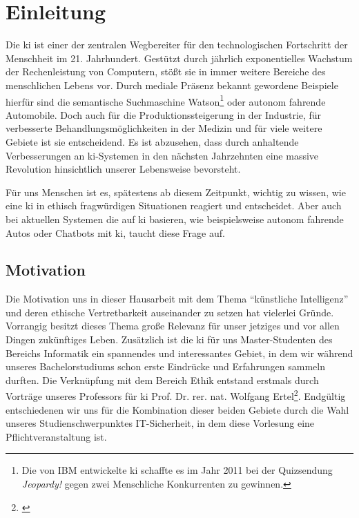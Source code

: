 \section{Einleitung}
Die \ac{ki} ist einer der zentralen Wegbereiter für den technologischen Fortschritt der Menschheit im 21. Jahrhundert.
Gestützt durch jährlich exponentielles Wachstum der Rechenleistung von Computern, stößt sie in immer weitere Bereiche des menschlichen Lebens vor.
Durch mediale Präsenz bekannt gewordene Beispiele hierfür sind die semantische Suchmaschine Watson\footnote{Die von IBM entwickelte \ac{ki} schaffte es im Jahr 2011 bei der Quizsendung \textit{Jeopardy!} gegen zwei Menschliche Konkurrenten zu gewinnen.} oder autonom fahrende Automobile. %
Doch auch für die Produktionssteigerung in der Industrie, für verbesserte Behandlungsmöglichkeiten in der Medizin und für viele weitere Gebiete ist sie entscheidend.
Es ist abzusehen, dass durch anhaltende Verbesserungen an \ac{ki}-Systemen in den nächsten Jahrzehnten eine massive Revolution hinsichtlich unserer Lebensweise bevorsteht.

Für uns Menschen ist es, spätestens ab diesem Zeitpunkt, wichtig zu wissen, wie eine \ac{ki} in ethisch fragwürdigen Situationen reagiert und entscheidet. Aber auch bei aktuellen Systemen die auf \ac{ki} basieren, wie beispielsweise autonom fahrende Autos oder Chatbots mit \ac{ki}, taucht diese Frage auf. 

\subsection{Motivation}
Die Motivation uns in dieser Hausarbeit mit dem Thema \enquote{künstliche Intelligenz} und deren ethische Vertretbarkeit auseinander zu setzen hat vielerlei Gründe. 
Vorrangig besitzt dieses Thema große Relevanz für unser jetziges und vor allen Dingen zukünftiges Leben. 
Zusätzlich ist die \ac{ki} für uns Master-Studenten des Bereichs Informatik ein spannendes und interessantes Gebiet, in dem wir während unseres Bachelorstudiums schon erste Eindrücke und Erfahrungen sammeln durften.
Die Verknüpfung mit dem Bereich Ethik entstand erstmals durch Vorträge unseres Professors für \ac{ki} Prof. Dr. rer. nat. Wolfgang Ertel\footnote{\cite{ProfessorErtel}}. Endgültig entschiedenen wir uns für die Kombination dieser beiden Gebiete durch die Wahl unseres Studienschwerpunktes IT-Sicherheit, in dem diese Vorlesung eine Pflichtveranstaltung ist.

